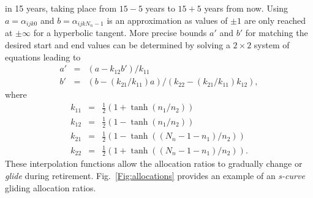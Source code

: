 \documentclass{report}[fleqn,11pt]
\begin{document}
\begin{description}[leftmargin=4em,style=multiline]
	in 15 years, taking place from $15-5$ years to $15+5$ years from now.
	Using $a = \alpha_{ijk0}$ and $b = \alpha_{ijkN_n-1}$ is an approximation as values of $\pm 1$
	are only reached at $\pm \infty$ for a hyperbolic tangent.
	More precise bounds $a'$ and $b'$ for matching the desired start and end values
	can be determined by solving a $2\times 2$ system of equations leading to
	\begin{eqnarray}
		a' &=& (a - k_{12}b')/k_{11} \nonumber \\
		b' &=& (b - (k_{21}/k_{11})a)/(k_{22} - (k_{21}/k_{11})k_{12}),
	\end{eqnarray}
	where
	\begin{eqnarray}
		k_{11} &=& \frac{1}{2}(1 + \tanh(n_1/n_2)) \nonumber \\
		k_{12} &=& \frac{1}{2}(1 - \tanh(n_1/n_2)) \nonumber \\
		k_{21} &=& \frac{1}{2}(1 - \tanh((N_n-1-n_1)/n_2)) \nonumber \\
		k_{22} &=& \frac{1}{2}(1 + \tanh((N_n-1-n_1)/n_2)).
	\end{eqnarray}
	These interpolation functions allow the allocation ratios to gradually change
	or {\em glide} during retirement. Fig.~\ref{Fig:allocations} provides an example
	of an {\em s-curve} gliding allocation ratios.


\end{description}
\end{document}
